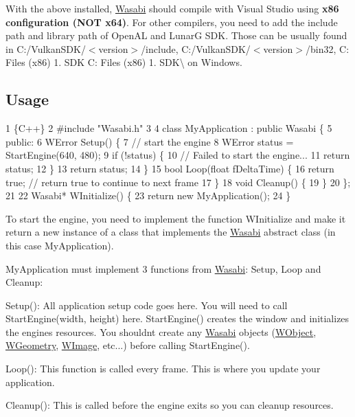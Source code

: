 With the above installed, \hyperlink{class_wasabi}{Wasabi} should compile with Visual Studio using {\bfseries x86 configuration (N\+OT x64)}. For other compilers, you need to add the include path and library path of Open\+AL and LunarG S\+DK. Those can be usually found in C\+:/\+Vulkan\+S\+D\+K/$<$version$>$/include, C\+:/\+Vulkan\+S\+D\+K/$<$version$>$/bin32, C\+: Files (x86) 1. S\+DK C\+: Files (x86) 1. S\+DK\textbackslash{} on Windows.

\subsection*{Usage}


\begin{DoxyCode}
1 \{C++\}
2 #include "Wasabi.h"
3 
4 class MyApplication : public Wasabi \{
5 public:
6   WError Setup() \{
7     // start the engine
8     WError status = StartEngine(640, 480);
9     if (!status) \{
10       // Failed to start the engine...
11       return status;
12     \}
13     return status;
14   \}
15   bool Loop(float fDeltaTime) \{
16     return true; // return true to continue to next frame
17   \}
18   void Cleanup() \{
19   \}
20 \};
21 
22 Wasabi* WInitialize() \{
23   return new MyApplication();
24 \}
\end{DoxyCode}


To start the engine, you need to implement the function W\+Initialize and make it return a new instance of a class that implements the \hyperlink{class_wasabi}{Wasabi} abstract class (in this case My\+Application).

My\+Application must implement 3 functions from \hyperlink{class_wasabi}{Wasabi}\+: Setup, Loop and Cleanup\+:


\begin{DoxyItemize}
\item Setup()\+: All application setup code goes here. You will need to call Start\+Engine(width, height) here. Start\+Engine() creates the window and initializes the engine\textquotesingle{}s resources. You shouldn\textquotesingle{}t create any \hyperlink{class_wasabi}{Wasabi} objects (\hyperlink{class_w_object}{W\+Object}, \hyperlink{class_w_geometry}{W\+Geometry}, \hyperlink{class_w_image}{W\+Image}, etc...) before calling Start\+Engine().
\item Loop()\+: This function is called every frame. This is where you update your application.
\item Cleanup()\+: This is called before the engine exits so you can cleanup resources.
\end{DoxyItemize}


